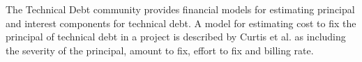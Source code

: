 The Technical Debt community provides financial models for estimating principal and interest components for technical debt.  A model for estimating cost to fix the principal of technical debt in a project is described by Curtis et al. \cite{Curtis2012Estimating} as including the severity of the principal, amount to fix, effort to fix and billing rate.